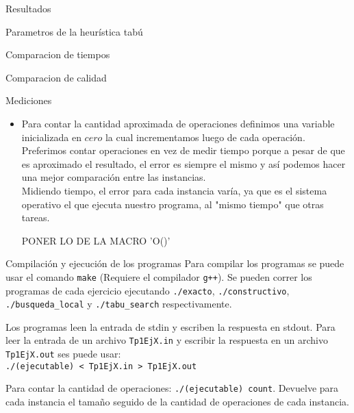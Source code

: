 \documentclass[12pt,titlepage]{article}
\begin{document}
	

	\newpage

	

	\newpage

	
	
	\newpage
	
	
	
	\newpage
	
	\begin{section}{Resultados}
		\begin{subsection}{Parametros de la heurística tabú}
		\end{subsection}		

		\begin{subsection}{Comparacion de tiempos}
		\end{subsection}

		\begin{subsection}{Comparacion de calidad}
		\end{subsection}
	\end{section}
	
	\begin{section}{Mediciones}
		\begin{itemize}
			\item Para contar la cantidad aproximada de operaciones definimos una variable inicializada en $cero$ la cual incrementamos luego de cada operación. Preferimos contar operaciones en vez de medir tiempo porque a pesar de que es aproximado el resultado, el error es siempre el mismo y así podemos hacer una mejor comparación entre las instancias.\\
			Midiendo tiempo, el error para cada instancia varía, ya que es el sistema operativo el que ejecuta nuestro programa, al "mismo tiempo" que otras tareas.


			PONER LO DE LA MACRO 'O()'
		\end{itemize}
	\end{section}
	\begin{section}{Compilación y ejecución de los programas}
	Para compilar los programas se puede usar el comando \texttt{make} (Requiere el compilador \texttt{g++}).
	Se pueden correr los programas de cada ejercicio ejecutando \texttt{./exacto}, \texttt{./constructivo}, \texttt{./busqueda\_local} y \texttt{./tabu\_search} respectivamente.
		
	Los programas leen la entrada de stdin y escriben la respuesta en stdout. Para leer la entrada de un archivo \texttt{Tp1EjX.in} y escribir la respuesta en un archivo \texttt{Tp1EjX.out} ses puede usar:\\ \texttt{./(ejecutable) < Tp1EjX.in > Tp1EjX.out}

	Para contar la cantidad de operaciones: \texttt{./(ejecutable) count}. Devuelve para cada instancia el tamaño seguido de la cantidad de operaciones de cada instancia.
	\end{section}
\end{document}

